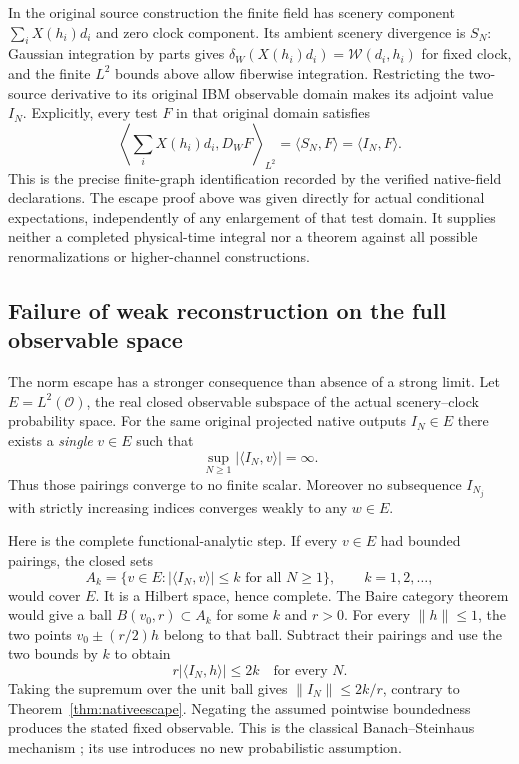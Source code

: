 \documentclass[11pt]{article}
\theoremstyle{remark}\newtheorem{remark}[theorem]{Remark}
\begin{document}
In the original source construction the finite field has scenery
component $\sum_i X(h_i)d_i$ and zero clock component.
Its ambient scenery divergence is $S_N$: Gaussian integration by
parts gives $\delta_W(X(h_i)d_i)=\mathcal W(d_i,h_i)$ for fixed
clock, and the finite $L^2$ bounds above allow fiberwise integration.
Restricting the two-source derivative to its original IBM observable
domain makes its adjoint value $I_N$. Explicitly, every test $F$ in
that original domain satisfies
\[
 \left\langle\sum_iX(h_i)d_i,D_WF\right\rangle_{L^2}
 =\langle S_N,F\rangle=\langle I_N,F\rangle.
\]
This is the precise finite-graph identification recorded by the
verified native-field declarations. The escape proof above was given
directly for actual conditional expectations, independently of any
enlargement of that test domain. It supplies neither a completed
physical-time integral nor a theorem against all possible
renormalizations or higher-channel constructions.


\subsection{Failure of weak reconstruction on the full observable space}
The norm escape has a stronger consequence than absence of a strong
limit. Let $E=L^2(\mathcal O)$, the real closed observable subspace
of the actual scenery--clock probability space. For the same original
projected native outputs $I_N\in E$ there exists a \emph{single}
$v\in E$ such that
\[
 \sup_{N\ge1}|\langle I_N,v\rangle|=\infty.
\]
Thus those pairings converge to no finite scalar. Moreover no
subsequence $I_{N_j}$ with strictly increasing indices converges
weakly to any $w\in E$.

Here is the complete functional-analytic step. If every $v\in E$
had bounded pairings, the closed sets
\[
 A_k=\{v\in E:|\langle I_N,v\rangle|\le k
                         \text{ for all }N\ge1\},\qquad k=1,2,\ldots,
\]
would cover $E$. It is a Hilbert space, hence complete. The Baire
category theorem would give a ball $B(v_0,r)\subset A_k$ for some
$k$ and $r>0$. For every $\|h\|\le1$, the two points
$v_0\pm(r/2)h$ belong to that ball. Subtract their pairings and use
the two bounds by $k$ to obtain
\[
 r|\langle I_N,h\rangle|\le2k\quad\text{for every }N.
\]
Taking the supremum over the unit ball gives
$\|I_N\|\le2k/r$, contrary to Theorem~\ref{thm:nativeescape}.
Negating the assumed pointwise boundedness produces the stated fixed
observable. This is the classical Banach--Steinhaus mechanism
\cite{BS}; its use introduces no new probabilistic assumption.
\end{document}
